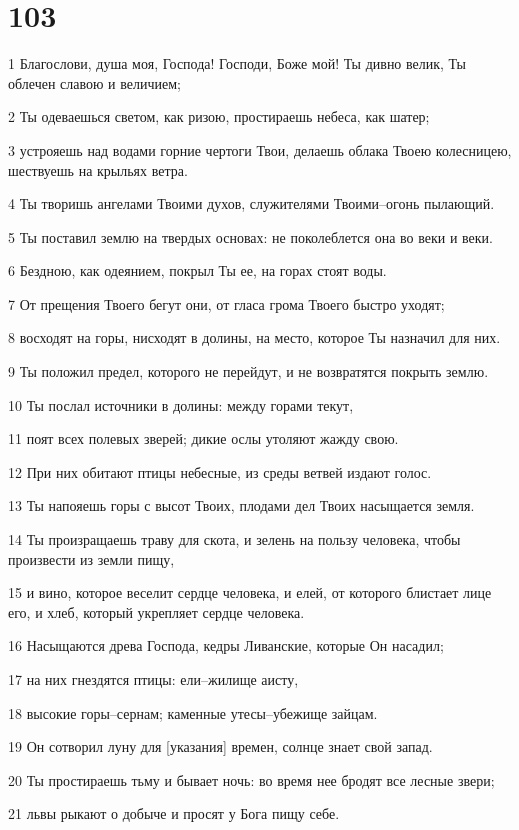 \chapter{103}

\par 1 Благослови, душа моя, Господа! Господи, Боже мой! Ты дивно велик, Ты облечен славою и величием;
\par 2 Ты одеваешься светом, как ризою, простираешь небеса, как шатер;
\par 3 устрояешь над водами горние чертоги Твои, делаешь облака Твоею колесницею, шествуешь на крыльях ветра.
\par 4 Ты творишь ангелами Твоими духов, служителями Твоими--огонь пылающий.
\par 5 Ты поставил землю на твердых основах: не поколеблется она во веки и веки.
\par 6 Бездною, как одеянием, покрыл Ты ее, на горах стоят воды.
\par 7 От прещения Твоего бегут они, от гласа грома Твоего быстро уходят;
\par 8 восходят на горы, нисходят в долины, на место, которое Ты назначил для них.
\par 9 Ты положил предел, которого не перейдут, и не возвратятся покрыть землю.
\par 10 Ты послал источники в долины: между горами текут,
\par 11 поят всех полевых зверей; дикие ослы утоляют жажду свою.
\par 12 При них обитают птицы небесные, из среды ветвей издают голос.
\par 13 Ты напояешь горы с высот Твоих, плодами дел Твоих насыщается земля.
\par 14 Ты произращаешь траву для скота, и зелень на пользу человека, чтобы произвести из земли пищу,
\par 15 и вино, которое веселит сердце человека, и елей, от которого блистает лице его, и хлеб, который укрепляет сердце человека.
\par 16 Насыщаются древа Господа, кедры Ливанские, которые Он насадил;
\par 17 на них гнездятся птицы: ели--жилище аисту,
\par 18 высокие горы--сернам; каменные утесы--убежище зайцам.
\par 19 Он сотворил луну для [указания] времен, солнце знает свой запад.
\par 20 Ты простираешь тьму и бывает ночь: во время нее бродят все лесные звери;
\par 21 львы рыкают о добыче и просят у Бога пищу себе.
